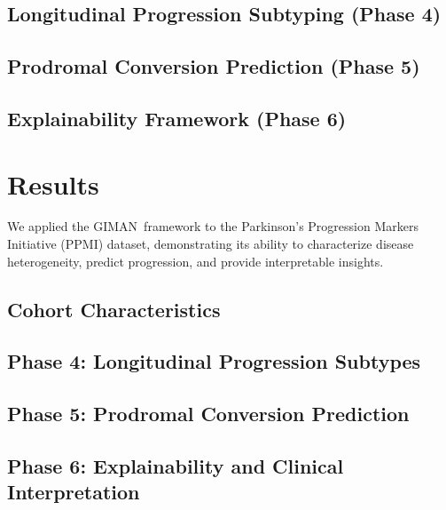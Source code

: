 \documentclass[9pt,twocolumn]{article}
\newcommand{\giman}{\textsc{GIMAN}}
\newcommand{\ppmi}{\textsc{PPMI}}
\begin{document}
\subsection{Longitudinal Progression Subtyping (Phase 4)}
\label{sec:methods:phase4}


\subsection{Prodromal Conversion Prediction (Phase 5)}
\label{sec:methods:phase5}


\subsection{Explainability Framework (Phase 6)}
\label{sec:methods:phase6}


\section{Results}
\label{sec:results}

We applied the \giman\ framework to the Parkinson's Progression Markers Initiative (\ppmi) dataset, demonstrating its ability to characterize disease heterogeneity, predict progression, and provide interpretable insights.

\subsection{Cohort Characteristics}
\label{sec:results:cohort}


\subsection{Phase 4: Longitudinal Progression Subtypes}
\label{sec:results:phase4}


\subsection{Phase 5: Prodromal Conversion Prediction}
\label{sec:results:phase5}


\subsection{Phase 6: Explainability and Clinical Interpretation}
\label{sec:results:phase6}

\end{document}
